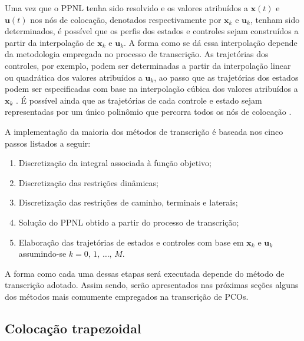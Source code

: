 Uma vez que o PPNL tenha sido resolvido e os valores atribuídos a $ \mathbf{x}(t) $ e $ \mathbf{u}(t) $ nos nós de colocação, denotados respectivamente por $ \mathbf{x}_k $ e $ \mathbf{u}_k $, tenham sido determinados, é possível que os perfis dos estados e controles sejam construídos a partir da interpolação de $ \mathbf{x}_k $ e $ \mathbf{u}_k $. A forma como se dá essa interpolação depende da metodologia empregada no processo de transcrição. As trajetórias dos controles, por exemplo, podem ser determinadas a partir da interpolação linear ou quadrática dos valores atribuídos a $ \mathbf{u}_k $, ao passo que as trajetórias dos estados podem ser especificadas com base na interpolação cúbica dos valores atribuídos a $ \mathbf{x}_k $ \cite{kelly_introduction_2017}. É possível ainda que as trajetórias de cada controle e estado sejam representadas por um único polinômio que percorra todos os nós de colocação \cite{becerra_psopt_2019}. 



A implementação da maioria dos métodos de transcrição é baseada nos cinco passos listados a seguir:
%
\begin{enumerate}
	\item Discretização da integral associada à função objetivo;
	\item Discretização das restrições dinâmicas;
	\item Discretização das restrições de caminho, terminais e laterais;
	\item Solução do PPNL obtido a partir do processo de transcrição;
	\item Elaboração das trajetórias de estados e controles com base em $ \mathbf{x}_k $ e $ \mathbf{u}_k $ assumindo-se $ k = 0, \, 1, \, \dots, \, M $.
\end{enumerate}

A forma como cada uma dessas etapas será executada depende do método de transcrição adotado. Assim sendo, serão apresentados nas próximas seções alguns dos métodos mais comumente empregados na transcrição de PCOs.

\subsection{Colocação trapezoidal}
\label{sec:revisao:trap}

